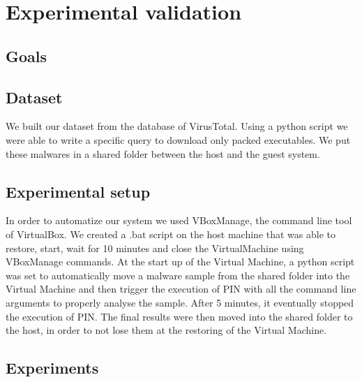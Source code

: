 \chapter{Experimental validation}
\label{chapter5}
\thispagestyle{empty}

\section{Goals}


\section{Dataset}
We built our dataset from the database of VirusTotal. Using a python script we were able to write a specific query to download only packed executables. We put these malwares in a shared folder between the host and the guest system.

\section{Experimental setup}
In order to automatize our system we used VBoxManage, the command line tool of VirtualBox. We created a .bat script on the host machine that was able to restore, start, wait for 10 minutes and close the VirtualMachine using VBoxManage commands. At the start up of the Virtual Machine, a python script was set to automatically move a malware sample from the shared folder into the Virtual Machine and then trigger the execution of PIN with all the command line arguments to properly analyse the sample. After 5 minutes, it eventually stopped the execution of PIN. The final results were then moved into the shared folder to the host, in order to not lose them at the restoring of the Virtual Machine.
\section{Experiments}

